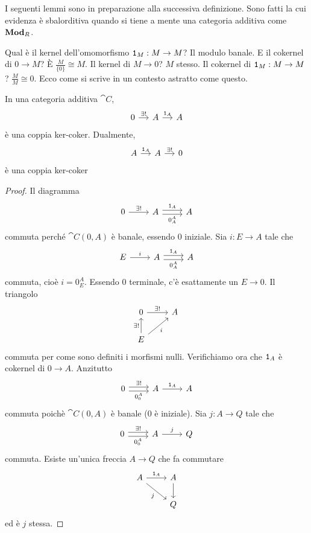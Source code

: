 I seguenti lemmi sono in preparazione alla successiva definizione. Sono
fatti la cui evidenza è sbalorditiva quando si tiene a mente una
categoria additiva come \(\mathbf{Mod}_R\).

Qual è il kernel dell'omomorfismo \(\mathtt 1_M : M \to M\)? Il modulo
banale. E il cokernel di \(0 \to M\)? È \(\frac{M}{\{0\}} \cong M\). Il
kernel di \(M \to 0\)? \(M\) stesso. Il cokernel di \(\mathtt 1_M : M \to M\)?
\(\frac{M}{M} \cong 0\). Ecco come si scrive in un contesto astratto
come questo.

\begin{lemma}\label{lemma:KerCokerId}
  In una categoria additiva \(\cat C \),
  \[
    \begin{tikzcd}[column sep=small]
      0 \ar["{\exists!}", r] & A \ar["{\id_A}", r] & A
    \end{tikzcd}
  \]
  è una coppia ker-coker. Dualmente,
  \[
    \begin{tikzcd}[column sep=small]
      A \ar["{\id_A}", r] & A \ar["{\exists!}", r] & 0
    \end{tikzcd}
  \]
  è una coppia ker-coker
\end{lemma}

\begin{proof}
  Il diagramma
  \[
    \begin{tikzcd}
      0 \ar["{\exists!}", r] & A \ar["{\id_A}", r, shift left]
      \ar["{0_A^A}", r, shift right, swap] & A
    \end{tikzcd}
  \]
  commuta perché \(\cat C(0,A)\) è banale, essendo \(0\) iniziale. Sia
  \(i : E \to A\) tale che
  \[
    \begin{tikzcd}
      E \ar["{i}", r] & A \ar["{\id_A}", r, shift left] \ar["{0_A^A}",
      r, shift right, swap] & A
    \end{tikzcd}
  \]
  commuta, cioè \(i = 0_E^A \). Essendo 0 terminale, c'è esattamente un
  \(E \to 0\). Il triangolo
  \[
    \begin{tikzcd}
      0 \ar["{\exists!}", r] & A \\
      E \ar["{\exists!}", u] \ar["i", ur, swap]
    \end{tikzcd}
  \]
  commuta per come sono definiti i morfismi nulli.  Verifichiamo ora che
  \(\mathtt 1_A\) è cokernel di \(0 \to A\). Anzitutto
  \[
    \begin{tikzcd}
      0 \ar["{\exists!}", r, shift left] \ar["{0_0^A}", r, shift right,
      swap] & A \ar["{\id_A}", r] & A
    \end{tikzcd}
  \]
  commuta poichè \(\cat C(0,A)\) è banale (\(0\) è iniziale). Sia
  \(j:A \to Q\) tale che
  \[
    \begin{tikzcd}
      0 \ar["{\exists!}", r, shift left] \ar["{0_0^A}", r, shift right,
      swap] & A \ar["{j}", r] & Q
    \end{tikzcd}
  \]
  commuta. Esiste un'unica freccia \(A \to Q\) che fa commutare
  \[
    \begin{tikzcd}
      A \ar["{\id_A}", r] \ar["j", dr, swap] & A \ar[d] \\
      & Q
    \end{tikzcd}
  \]
  ed è \(j\) stessa.
\end{proof}

